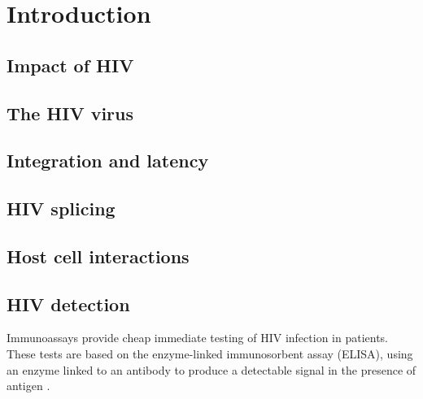 \documentclass[../sherrill-Mix_thesis.tex]{subfiles}
\begin{document}
\graphicspath{{im/}{intro/im/}}
\chapter{Introduction}
\section{Impact of HIV}

\section{The HIV virus}

\section{Integration and latency}


\section{HIV splicing}

\section{Host cell interactions}



\section{HIV detection}
	Immunoassays provide cheap immediate testing of HIV infection in patients. These tests are based on the enzyme-linked immunosorbent assay (ELISA), using an enzyme linked to an antibody to produce a detectable signal in the presence of antigen \citep{Yalow1960,Engvall1971,VanWeemen1971}. %
	
\end{document}

